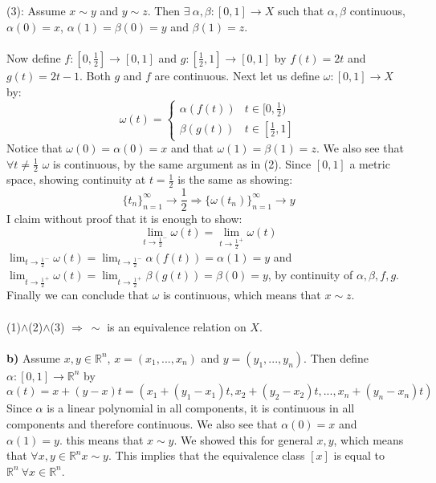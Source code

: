 \documentclass[11pt,a4paper]{report}
\begin{document}
\\
\\
(3): Assume $x \sim y$ and $y \sim z$. Then $ \exists \ \alpha,\beta:[0,1]\rightarrow X$ such that $\alpha,\beta$ continuous, $\alpha(0)=x$, $\alpha(1)=\beta(0)=y$ and $\beta(1)=z$. 
\\
\\
Now define $f:[0,\frac{1}{2}]\rightarrow[0,1]$ and $g:[\frac{1}{2},1]\rightarrow[0,1]$ by $f(t)=2t$ and $g(t)= 2t-1$. Both $g$ and $f$ are continuous. Next let us define $\omega:[0,1]\rightarrow X$ by:
\begin{displaymath}
   \omega(t) = \left\{
     \begin{array}{lr}
       \alpha(f(t)) &  t \in [0,\frac{1}{2}) \\
       \beta(g(t)) &  t \in [\frac{1}{2},1]
     \end{array}
   \right.
\end{displaymath} 
Notice that $\omega(0)=\alpha(0)=x$ and that $\omega(1)=\beta(1)=z$. We also see that $\forall t \neq \frac{1}{2}$ $\omega$ is continuous, by the same argument as in (2). Since $[0,1]$ a metric space, showing continuity at $t=\frac{1}{2}$ is the same as showing: $$\{ t_n \}_{n=1}^{\infty} \rightarrow \frac{1}{2} \Rightarrow \{ \omega(t_n) \}_{n=1}^{\infty} \rightarrow y$$
I claim without proof that it is enough to show: $$\lim_{t\rightarrow \frac{1}{2}^-} \omega(t)=\lim_{t\rightarrow \frac{1}{2}^+}\omega(t)$$
$\lim_{t\rightarrow \frac{1}{2}^-} \omega(t) = \lim_{t\rightarrow \frac{1}{2}^-} \alpha(f(t))=\alpha(1)=y$ and 
\\
$\lim_{t\rightarrow \frac{1}{2}^+} \omega(t) = \lim_{t\rightarrow \frac{1}{2}^+} \beta(g(t))=\beta(0)=y$, by continuity of $\alpha,\beta,f,g$. Finally we can conclude that $\omega$ is continuous, which means that $x \sim z$.
\\
\\
(1)$\wedge$(2)$\wedge$(3) $\Rightarrow \ \sim $ is an equivalence relation on $X$.
\\
\\
\textbf{b)} Assume $x,y \in \mathbb{R}^n$, $x=(x_1,...,x_n)$ and $y=(y_1,...,y_n)$. Then define $\alpha:[0,1]\rightarrow \mathbb{R}^n$ by $$\alpha(t)=x+(y-x)t=(x_1+(y_1-x_1)t,x_2+(y_2-x_2)t,...,x_n+(y_n-x_n)t)$$
Since $\alpha$ is a linear polynomial in all components, it is continuous in all components and therefore continuous. We also see that $\alpha(0)=x$ and $\alpha(1)=y$. this means that $x \sim y$. We showed this for general $x,y$, which means that $\forall x,y \in \mathbb{R}^n x \sim y$. This implies that the equivalence class $[x]$ is equal to $\mathbb{R}^n \ \forall x \in \mathbb{R}^n$. 
\end{document}
